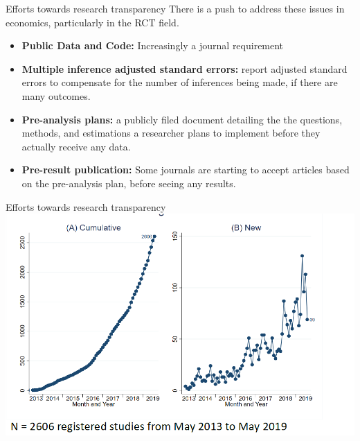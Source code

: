 \documentclass[
  ignorenonframetext,
]{beamer}
\begin{document}
\begin{frame}{Efforts towards research transparency}
\protect\hypertarget{efforts-towards-research-transparency}{}
There is a push to address these issues in economics, particularly in
the RCT field.

\begin{itemize}
\item
  \textbf{Public Data and Code:} Increasingly a journal requirement
\item
  \textbf{Multiple inference adjusted standard errors:} report adjusted
  standard errors to compensate for the number of inferences being made,
  if there are many outcomes.
\item
  \textbf{Pre-analysis plans:} a publicly filed document detailing the
  the questions, methods, and estimations a researcher plans to
  implement before they actually receive any data.
\item
  \textbf{Pre-result publication:} Some journals are starting to accept
  articles based on the pre-analysis plan, before seeing any results.
\end{itemize}
\end{frame}

\begin{frame}{Efforts towards research transparency}
\protect\hypertarget{efforts-towards-research-transparency-1}{}
\includegraphics{"images/PAP.png"}
\end{frame}
\end{document}
